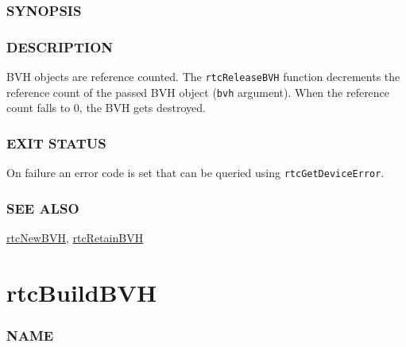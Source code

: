 \subsubsection{SYNOPSIS}\label{synopsis}

\begin{Shaded}
\begin{Highlighting}[]

\OperatorTok{(}\OperatorTok{);}
\end{Highlighting}
\end{Shaded}

\subsubsection{DESCRIPTION}\label{description}

BVH objects are reference counted. The \texttt{rtcReleaseBVH} function
decrements the reference count of the passed BVH object (\texttt{bvh}
argument). When the reference count falls to 0, the BVH gets destroyed.

\subsubsection{EXIT STATUS}\label{exit-status}

On failure an error code is set that can be queried using
\texttt{rtcGetDeviceError}.

\subsubsection{SEE ALSO}\label{see-also}

\hyperref[rtcnewbvh]{rtcNewBVH}, \hyperref[rtcretainbvh]{rtcRetainBVH}

\pagebreak

\section{rtcBuildBVH}\label{rtcbuildbvh}

\subsubsection{NAME}\label{name}

\begin{Shaded}
\begin{Highlighting}[]
\OperatorTok{{-}}
\end{Highlighting}
\end{Shaded}

